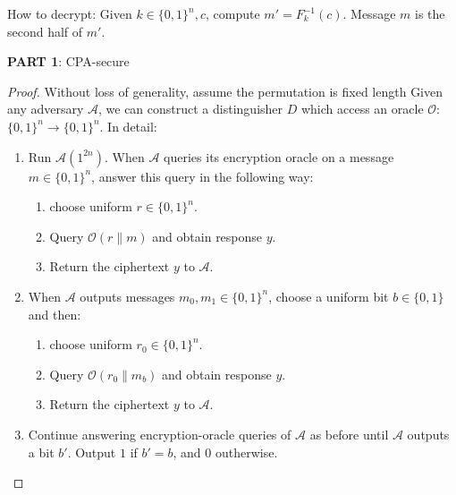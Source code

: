 \documentclass[12pt]{article}
\newcommand{\A}{\mathcal{A}}
\newcommand{\OO}{\mathcal{O}}
\newenvironment{problem}[2][Problem]{\begin{trivlist}
\item[\hskip \labelsep {\bfseries #1}\hskip \labelsep {\bfseries #2.}]}{\end{trivlist}}
\begin{document}
\begin{problem}{3.18}
How to decrypt: Given $k\in\{0,1\}^n,c$, compute $m'=F_k^{-1}(c)$. Message $m$ is the second half of $m'$.\par
\textbf{PART 1}: CPA-secure\par
\begin{proof}
Without loss of generality, assume the permutation is fixed length 
Given any adversary $\A$, we can construct a distinguisher $D$ which access an oracle $\OO$:$\{0,1\}^{n}\rightarrow\{0,1\}^{n}$. In detail:
\begin{enumerate}
    \item Run $\A(1^{2n})$. When $\A$ queries its encryption oracle on a message $m\in \{0,1\}^{n}$, answer this query in the following way:
    \begin{enumerate}
        \item choose uniform $r\in\{0,1\}^n$.
        \item Query $\OO(r\|m)$ and obtain response $y$.
        \item Return the ciphertext $y$ to $\A$.
    \end{enumerate}
    \item When $\A$ outputs messages $m_0,m_1\in\{0,1\}^n$, choose a uniform bit $b\in\{0,1\}$ and then:
    \begin{enumerate}
        \item choose uniform $r_0\in\{0,1\}^n$.
        \item Query $\OO(r_0\|m_b)$ and obtain response $y$.
        \item Return the ciphertext $y$ to $\A$.
    \end{enumerate}
    \item Continue answering encryption-oracle queries of $\A$ as before
until $\A$ outputs a bit $b'$. Output $1$ if $b'=b$, and $0$ outherwise.
\end{enumerate}


\end{proof}
\end{problem}
\end{document}
